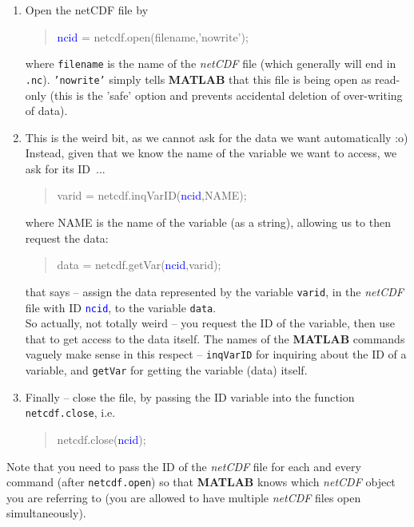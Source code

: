 \documentclass{tufte-book} %
\newenvironment{docspec}{\begin{quotation}\ttfamily\parskip0pt\parindent0pt\ignorespaces}{\end{quotation}}
\begin{document}
\begin{enumerate}
\begin{enumerate}[noitemsep]
\setlength{\itemindent}{.2in}
\item Open the netCDF file by
\begin{docspec}
\textcolor{blue}{ncid} = netcdf.open(filename,'nowrite');
\end{docspec}
where \texttt{filename} is the name of the \textit{netCDF} file (which generally will end in \texttt{.nc}). \texttt{'nowrite'} simply tells \textbf{MATLAB} that this file is being open as read-only (this is the 'safe' option and prevents accidental deletion of over-writing of data).
\item This is the weird bit, as we cannot ask for the data we want automatically :o) Instead, given that we know the name of the variable we want to access, we ask for its ID\ ...
\begin{docspec}
\textcolor[rgb]{0,0.501961,0.25098}{varid}  = netcdf.inqVarID(\textcolor{blue}{ncid},NAME);
\end{docspec}
where NAME is the name of the variable (as a string), allowing us to then request the data:
\begin{docspec}
data  = netcdf.getVar(\textcolor{blue}{ncid},\textcolor[rgb]{0,0.501961,0.25098}{varid});
\end{docspec}
that says -- assign the data represented by the variable \texttt{\textcolor[rgb]{0,0.501961,0.25098}{varid}}, in the \textit{netCDF} file with ID \texttt{\textcolor{blue}{ncid}}, to the variable \texttt{data}.
\\So actually, not totally weird -- you request the ID of the variable, then use that to get access to the data itself. The names of the \textbf{MATLAB} commands vaguely make sense in this respect -- \texttt{inqVarID} for inquiring about the ID of a variable, and \texttt{getVar} for getting the variable (data) itself.
\item Finally -- close the file, by passing the ID variable into the function \texttt{netcdf.close}, i.e.
\begin{docspec}
netcdf.close(\textcolor{blue}{ncid});
\end{docspec}
\end{enumerate}

Note that you need to pass the ID of the \textit{netCDF} file for each and every command (after \texttt{netcdf.open}) so that \textbf{MATLAB} knows which \textit{netCDF} object you are referring to (you are allowed to have multiple \textit{netCDF} files open simultaneously).

\end{enumerate}
\end{document}
